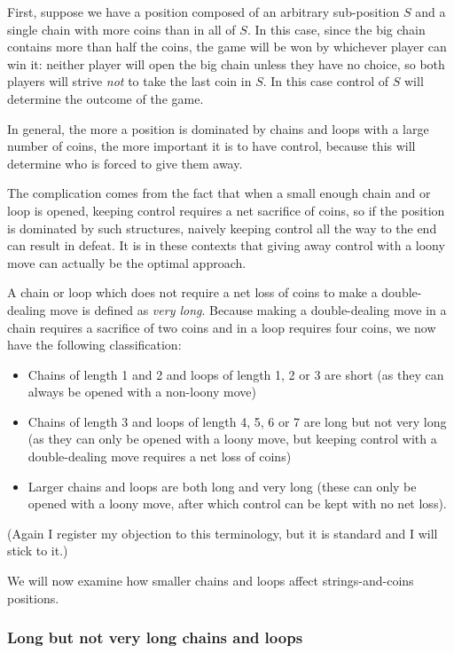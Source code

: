 \documentclass[a4paper,twocolumn]{article}
\begin{document}
First, suppose we have a position composed of an arbitrary
sub-position $S$ and a single chain with more coins than in all of
$S$. In this case, since the big chain contains more than half the
coins, the game will be won by whichever player can win it: neither
player will open the big chain unless they have no choice, so both
players will strive \emph{not} to take the last coin in $S$. In this
case control of $S$ will determine the outcome of the game.

In general, the more a position is dominated by chains and loops with
a large number of coins, the more important it is to have control,
because this will determine who is forced to give them away.

The complication comes from the fact that when a small enough chain
and or loop is opened, keeping control requires a net sacrifice of
coins, so if the position is dominated by such structures, naively
keeping control all the way to the end can result in defeat. It is in
these contexts that giving away control with a loony move can actually
be the optimal approach.

A chain or loop which does not require a net loss of coins to make a
double-dealing move is defined as \emph{very long}. Because making a
double-dealing move in a chain requires a sacrifice of two coins and
in a loop requires four coins, we now have the following
classification:

\begin{itemize}
  \item Chains of length 1 and 2 and loops of length 1, 2 or 3 are
    short (as they can always be opened with a non-loony move)
  \item Chains of length 3 and loops of length 4, 5, 6 or 7 are long
    but not very long (as they can only be opened with a loony move,
    but keeping control with a double-dealing move requires a net loss
    of coins)
  \item Larger chains and loops are both long and very long (these can
    only be opened with a loony move, after which control can be kept
    with no net loss).
\end{itemize}

(Again I register my objection to this terminology, but it is standard
and I will stick to it.)

We will now examine how smaller chains and loops affect
strings-and-coins positions.

\subsubsection{Long but not very long chains and loops}
\end{document}

